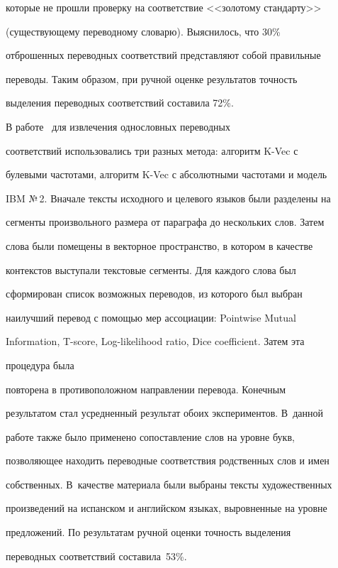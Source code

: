 которые не прошли проверку на соответствие <<золотому стандарту>>


(существующему переводному словарю). Выяснилось, что 30\%


отброшенных переводных соответствий представляют собой правильные


переводы. Таким образом, при ручной оценке результатов точность


выделения переводных соответствий составила 72\%.





     В работе~\cite{6-m} для извлечения однословных переводных


соответствий использовались три разных метода: алгоритм K-Vec с


булевыми частотами, алгоритм K-Vec с абсолютными частотами и модель


IBM №\,2. Вначале тексты исходного и целевого языков были разделены на


сегменты произвольного размера от параграфа до нескольких слов. Затем


слова были помещены в векторное пространство, в котором в качестве


контекстов выступали текстовые сегменты. Для каждого слова был


сформирован список возможных переводов, из которого был выбран


наилучший перевод с помощью мер ассоциации: Pointwise Mutual


Information, T-score, Log-likelihood ratio, Dice coefficient. Затем эта


процедура была


повторена в противоположном направлении перевода. Конечным


результатом стал усредненный результат обоих экспериментов. В~данной


работе также было применено сопоставление слов на уровне букв,


позволяющее находить переводные соответствия родственных слов и имен


собственных. В~качестве материала были выбраны тексты художественных


произведений на испанском и английском языках, выровненные на уровне


предложений. По результатам ручной оценки точность выделения


переводных соответствий составила~53\%.








